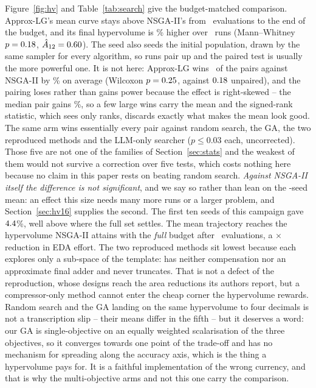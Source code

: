 \documentclass[acmsmall,review,anonymous]{acmart}
\begin{document}
Figure~\ref{fig:hv} and Table~\ref{tab:search} give the budget-matched
comparison.  Approx-LG's mean curve stays above NSGA-II's from \LeadFrom\
evaluations to the end of the budget, and its final hypervolume is
\HVgainEight\% higher over \SeedsEight\ runs (Mann--Whitney $p=0.18$,
$\hat{A}_{12}=0.60$).  The seed also seeds the initial population, drawn by
the same sampler for every algorithm, so runs pair up and the paired test is
usually the more powerful one.  It is not here: Approx-LG wins \PairedWins\ of
the pairs against NSGA-II by \PairedGain\% on average (Wilcoxon
$p=0.25$, against $0.18$ unpaired), and the pairing loses rather than
gains power because the effect is right-skewed -- the median pair gains
\PairedMedian\%, so a few large wins carry the mean and the signed-rank
statistic, which sees only ranks, discards exactly what makes the mean look
good.  The same arm wins essentially every pair against random search, the GA,
the two reproduced methods and the LLM-only searcher ($p\le0.03$ each,
uncorrected).  Those five are not one of the families of
Section~\ref{sec:stats} and the weakest of them would not survive a correction
over five tests, which costs nothing here because no claim in this paper rests
on beating random search.  \emph{Against NSGA-II itself the difference is not
significant}, and we say so rather than lean on the \SeedsEight-seed mean: an
effect this size needs many more runs or a larger problem, and
Section~\ref{sec:hv16} supplies the second.  The first ten seeds of this campaign
gave $4.4$\%, well above where the full set settles.  The mean
trajectory reaches the hypervolume NSGA-II attains with the \emph{full} budget
after \EvalsApproxLG\ evaluations, a \SpeedupEight$\times$ reduction in EDA
effort.  The two reproduced methods sit lowest because each explores only a
sub-space of the template: \cite{devi2025} has neither compensation nor an
approximate final adder and \cite{wen2025} never truncates.  That is not a
defect of the reproduction, whose designs reach the area reductions its authors
report, but a compressor-only method cannot enter the cheap corner the
hypervolume rewards.  Random search and the GA landing on the same hypervolume
to four decimals is not a transcription slip -- their means differ in the fifth
-- but it deserves a word: our GA is single-objective on an equally weighted
scalarisation of the three objectives, so it converges towards one point of the
trade-off and has no mechanism for spreading along the accuracy axis, which is
the thing a hypervolume pays for.  It is a faithful implementation of the wrong
currency, and that is why the multi-objective arms and not this one carry the
comparison.
\end{document}
